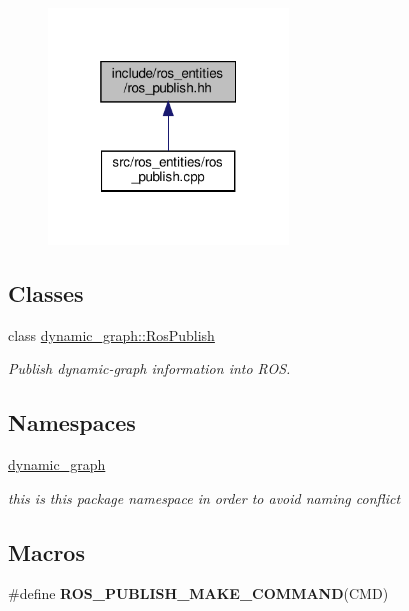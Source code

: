 \begin{figure}[H]
\begin{center}
\leavevmode
\includegraphics[width=181pt]{ros__publish_8hh__dep__incl}
\end{center}
\end{figure}
\subsection*{Classes}
\begin{DoxyCompactItemize}
\item 
class \hyperlink{classdynamic__graph_1_1RosPublish}{dynamic\+\_\+graph\+::\+Ros\+Publish}
\begin{DoxyCompactList}\small\item\em Publish dynamic-\/graph information into R\+OS. \end{DoxyCompactList}\end{DoxyCompactItemize}
\subsection*{Namespaces}
\begin{DoxyCompactItemize}
\item 
 \hyperlink{namespacedynamic__graph}{dynamic\+\_\+graph}
\begin{DoxyCompactList}\small\item\em this is this package namespace in order to avoid naming conflict \end{DoxyCompactList}\end{DoxyCompactItemize}
\subsection*{Macros}
\begin{DoxyCompactItemize}
\item 
\#define {\bfseries R\+O\+S\+\_\+\+P\+U\+B\+L\+I\+S\+H\+\_\+\+M\+A\+K\+E\+\_\+\+C\+O\+M\+M\+A\+ND}(C\+MD)
\end{DoxyCompactItemize}
